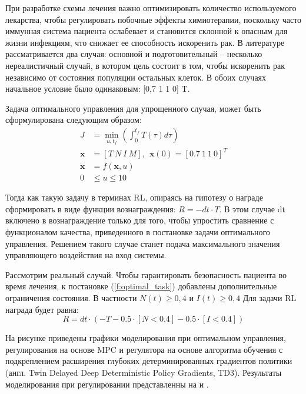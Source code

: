 При разработке схемы лечения важно оптимизировать количество используемого лекарства, чтобы регулировать побочные эффекты химиотерапии, поскольку часто иммунная система пациента ослабевает и становится склонной к опасным для жизни инфекциям, что снижает ее способность искоренить рак. В литературе рассматривается два случая: основной и подготовительный -- несколько нереалистичный случай, в котором цель состоит в том, чтобы искоренить рак независимо от состояния популяции остальных клеток. В обоих случаях начальное условие было одинаковым: [0,7 1 1 0] T.

Задача оптимального управления для упрощенного случая, может быть сформулирована следующим образом:
%
\begin{equation*}
\label{f:optimal_task}
\begin{split}
J &= \min_{u, t_f}(\int^{t_f}_0 T(\tau) d\tau) \\
\mathbf{x} &= [T\ N\ I \ M], \ \ \mathbf{x}(0) = [0.7 \ 1 \ 1 \ 0]^T\\
\dot{\mathbf{x}} &= f(\mathbf{x},u) \\
0 &\le u \le 10 
\end{split}
\end{equation*}

Тогда как такую задачу в терминах RL, опираясь на гипотезу о награде сформировать в виде функции вознаграждения: $R = -dt \cdot T$. В этом случае dt включено в вознаграждение только для того, чтобы упростить сравнение с функционалом качества, приведенного в постановке задачи оптимального управления.
Решением такого случае станет подача максимального значения управляющего воздействия на вход системы. 

Рассмотрим реальный случай. Чтобы гарантировать безопасность пациента во время лечения, к постановке (\ref{f:optimal_task}) добавлены дополнительные ограничения состояния. В частности $N (t) \ge 0,4$ и $I (t) \ge 0,4$
Для задачи RL награда будет равна:
\begin{equation*}
	R = dt \cdot (-T - 0.5 \cdot [N < 0.4] - 0.5 \cdot [I < 0.4])
\end{equation*}


На рисунке приведены графики моделирования при оптимальном управления, регулирования на основе MPC и регулятора на основе алгоритма обучения с подкреплением расширения глубоких детерминированных градиентов политики (англ. Twin Delayed Deep Deterministic Policy Gradients, TD3). Результаты моделирования при регулировании представленны на  и .

